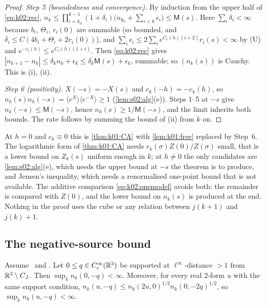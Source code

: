 \begin{proof}
\emph{Step 5 (boundedness and convergence).} By induction from the upper half of \eqref{eq:k02:rec}, $n_k\le\prod_{i=k_0}^{k-1}(1+\delta_i)\big(n_{k_0}+\sum_{i<k}\epsilon_i\big)\le\mathsf M(s)$. Here $\sum_i\delta_i<\infty$ because $b_i$, $\Theta_i$, $r_i(0)$ are summable (so bounded, and $\delta_i\le C(4b_i+\Theta_i+2r_i(0))$), and $\sum_i\epsilon_i\le2\sum_ie^{C_c(h)(i+2)}r_i(s)<\infty$ by (U) and $e^{-c_i(h)}\le e^{C_c(h)(1+i)}$. Then \eqref{eq:k02:rec} gives $|n_{k+1}-n_k|\le\delta_kn_k+\epsilon_k\le\delta_k\mathsf M(s)+\epsilon_k$, summable; so $(n_k(s))$ is Cauchy. This is (i), (ii).

\emph{Step 6 (positivity).} $X(-s)=-X(s)$ and $c_k(-h)=-c_k(h)$, so $n_k(s)n_k(-s)=\langle e^{X}\rangle\langle e^{-X}\rangle\ge1$ (\cref{lem:s02:alg}(e)). Steps 1--5 at $-s$ give $n_k(-s)\le\mathsf M(-s)$, hence $n_k(s)\ge1/\mathsf M(-s)$, and the limit inherits both bounds. The rate follows by summing the bound of (ii) from $k$ on.
\end{proof}

\begin{remark}\label{rem:k02:additive}
At $h=0$ and $c_k\equiv0$ this is \cref{thm:k01:CA} with \cref{lem:k01:free} replaced by Step~6. The logarithmic form of \cref{thm:k01:CA} needs $r_k(\sigma)Z(0)/Z(\sigma)$ small, that is a lower bound on $Z_k(s)$ uniform enough in $k$; at $h\ne0$ the only candidates are \cref{lem:s02:alg}(e), which needs the upper bound at $-s$ the theorem is to produce, and Jensen's inequality, which needs a renormalised one-point bound that is not available. The additive comparison \eqref{eq:k02:onemodel} avoids both: the remainder is compared with $Z(0)$, and the lower bound on $n_k(s)$ is produced at the end. Nothing in the proof uses the cube or any relation between $j(k+1)$ and $j(k)+1$.
\end{remark}

\subsection{The negative-source bound}\label{ssec:k02:UB}

\begin{theorem}\label{thm:k02:UB}
Assume \Itwo\ and \Ithree. Let $0\le q\in C^\infty_c(\mathbb R^3)$ be supported at $\ell^\infty$-distance $>1$ from $\mathbb R^3\setminus C_J$. Then $\sup_kn_k(0,-q)<\infty$. Moreover, for every real $2$-form $u$ with the same support condition, $n_k(u,-q)\le n_k(2u,0)^{1/2}n_k(0,-2q)^{1/2}$, so $\sup_kn_k(u,-q)<\infty$.
\end{theorem}

